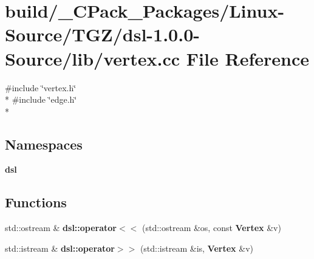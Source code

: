 \section{build/\-\_\-\-C\-Pack\-\_\-\-Packages/\-Linux-\/\-Source/\-T\-G\-Z/dsl-\/1.0.0-\/\-Source/lib/vertex.cc File Reference}
\label{build_2__CPack__Packages_2Linux-Source_2TGZ_2dsl-1_80_80-Source_2lib_2vertex_8cc}
{\ttfamily \#include \char`\"{}vertex.\-h\char`\"{}}\\*
{\ttfamily \#include \char`\"{}edge.\-h\char`\"{}}\\*
\subsection*{Namespaces}
\begin{DoxyCompactItemize}
\item 
{\bf dsl}
\end{DoxyCompactItemize}
\subsection*{Functions}
\begin{DoxyCompactItemize}
\item 
std\-::ostream \& {\bf dsl\-::operator$<$$<$} (std\-::ostream \&os, const {\bf Vertex} \&v)
\item 
std\-::istream \& {\bf dsl\-::operator$>$$>$} (std\-::istream \&is, {\bf Vertex} \&v)
\end{DoxyCompactItemize}
